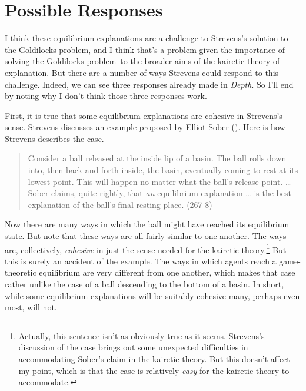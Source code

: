 \documentclass[
  10pt,
  letterpaper,
  DIV=11,
  numbers=noendperiod,
  twoside]{scrartcl}
\begin{document}
\section{Possible Responses}\label{possible-responses}

I think these equilibrium explanations are a challenge to Strevens's
solution to the Goldilocks problem, and I think that's a problem given
the importance of solving the Goldilocks problem~to the broader aims of
the kairetic theory of explanation. But there are a number of ways
Strevens could respond to this challenge. Indeed, we can see three
responses already made in \emph{Depth}. So I'll end by noting why I
don't think those three responses work.

First, it is true that some equilibrium explanations are cohesive in
Strevens's sense. Strevens discusses an example proposed by Elliot Sober
(). Here is how Strevens describes the
case.

\begin{quote}
Consider a ball released at the inside lip of a basin. The ball rolls
down into, then back and forth inside, the basin, eventually coming to
rest at its lowest point. This will happen no matter what the ball's
release point. \ldots{} Sober claims, quite rightly, that \emph{an}
equilibrium explanation \ldots{} is the best explanation of the ball's
final resting place. (267-8)
\end{quote}

Now there are many ways in which the ball might have reached its
equilibrium state. But note that these ways are all fairly similar to
one another. The ways are, collectively, \emph{cohesive} in just the
sense needed for the kairetic theory.\footnote{Actually, this sentence
  isn't as obviously true as it seems. Strevens's discussion of the case
  brings out some unexpected difficulties in accommodating Sober's claim
  in the kairetic theory. But this doesn't affect my point, which is
  that the case is relatively \emph{easy} for the kairetic theory to
  accommodate.} But this is surely an accident of the example. The ways
in which agents reach a game-theoretic equilibrium are very different
from one another, which makes that case rather unlike the case of a ball
descending to the bottom of a basin. In short, while some equilibrium
explanations will be suitably cohesive many, perhaps even most, will
not.
\end{document}

